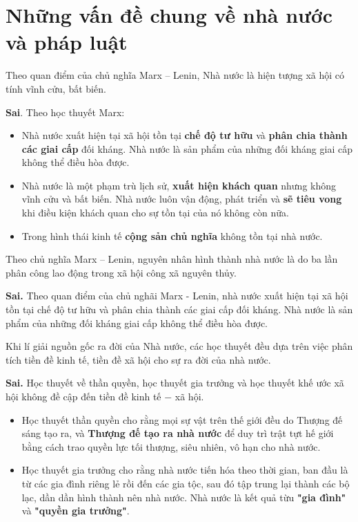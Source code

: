 \chapter{Những vấn đề chung về nhà nước và pháp luật}
\begin{ques}
Theo quan điểm của chủ nghĩa Marx – Lenin, Nhà nước là hiện tượng xã hội có tính vĩnh cửu, bất biến.
\end{ques}
\begin{ans}
\textbf{Sai}. Theo học thuyết Marx:
\begin{itemize}
\item Nhà nước xuất hiện tại xã hội tồn tại \textbf{chế độ tư hữu} và \textbf{phân chia thành các giai cấp} đối kháng. Nhà nước là sản phẩm của những đối kháng giai cấp không thể điều hòa được.
\item Nhà nước là một phạm trù lịch sử, \textbf{xuất hiện khách quan} nhưng không vĩnh cửu và bất biến. Nhà nước luôn vận động, phát triển và \textbf{sẽ tiêu vong} khi điều kiện khách quan cho sự tồn tại của nó không còn nữa.
\item Trong hình thái kinh tế \textbf{cộng sản chủ nghĩa} không tồn tại nhà nước.
\end{itemize}
\end{ans}

\begin{ques}
Theo chủ nghĩa Marx – Lenin, nguyên nhân hình thành nhà nước là do ba lần phân công lao động trong xã hội công xã nguyên thủy.
\end{ques}
\begin{ans}
\textbf{Sai.} Theo quan điểm của chủ nghãi Marx - Lenin, nhà nước xuất hiện tại xã hội tồn tại chế độ tư hữu và phân chia thành các giai cấp đối kháng. Nhà nước là sản phẩm của những đối kháng giai cấp không thể điều hòa được.
\end{ans}

\begin{ques}
Khi lí giải nguồn gốc ra đời của Nhà nước, các học thuyết đều dựa trên việc phân tích tiền đề kinh tế, tiền đề xã hội cho sự ra đời của nhà nước.
\end{ques}
\begin{ans}
\textbf{Sai.} Học thuyết về thần quyền, học thuyết gia trưởng và học thuyết khế ước xã hội không đề cập đến tiền đề kinh tế $-$ xã hội.
\begin{itemize}
\item Học thuyết thần quyền cho rằng mọi sự vật trên thế giới đều do Thượng đế sáng tạo ra, và \textbf{Thượng đế tạo ra nhà nước} để duy trì trật tựt hế giới bằng cách trao quyền lực tối thượng, siêu nhiên, vô hạn cho nhà nước.
\item Học thuyết gia trưởng cho rằng nhà nước tiến hóa theo thời gian, ban đầu là từ các gia đình riêng lẻ rồi đến các gia tộc, sau đó tập trung lại thành các bộ lạc, dần dần hình thành nên nhà nước. Nhà nước là kết quả từu \textbf{"gia đình"} và \textbf{"quyền gia trưởng"}.
\end{itemize}
\end{ans}

